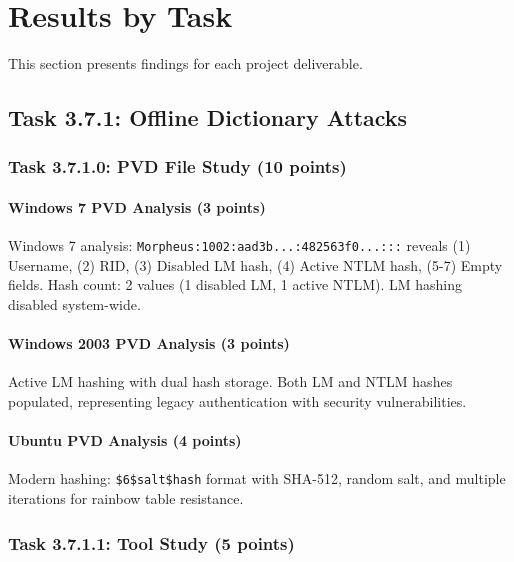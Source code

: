 \section{Results by Task}

This section presents findings for each project deliverable.

\subsection{Task 3.7.1: Offline Dictionary Attacks}

\subsubsection{Task 3.7.1.0: PVD File Study (10 points)}


\paragraph{Windows 7 PVD Analysis (3 points)}
{\small Windows 7 analysis: \texttt{Morpheus:1002:aad3b...:482563f0...:::} reveals (1) Username, (2) RID, (3) Disabled LM hash, (4) Active NTLM hash, (5-7) Empty fields. Hash count: 2 values (1 disabled LM, 1 active NTLM). LM hashing disabled system-wide.}

\paragraph{Windows 2003 PVD Analysis (3 points)}
{\small Active LM hashing with dual hash storage. Both LM and NTLM hashes populated, representing legacy authentication with security vulnerabilities.}

\paragraph{Ubuntu PVD Analysis (4 points)}
{\small Modern hashing: \texttt{\$6\$salt\$hash} format with SHA-512, random salt, and multiple iterations for rainbow table resistance.}


\subsubsection{Task 3.7.1.1: Tool Study (5 points)}

